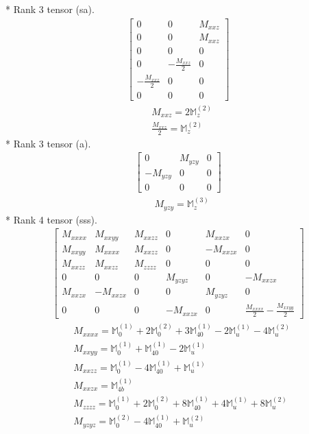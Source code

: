 \documentclass[fleqn,8pt,landscape]{jsarticle}
\begin{document}
* Rank 3 tensor (sa).
\begin{align*}
\begin{bmatrix} 0 & 0 & M_{xxz} \\ 0 & 0 & M_{xxz} \\ 0 & 0 & 0 \\ 0 & - \frac{M_{xxz}}{2} & 0 \\ - \frac{M_{xxz}}{2} & 0 & 0 \\ 0 & 0 & 0 \end{bmatrix}
\end{align*}
\begin{align*}
& M_{xxz} = 2 \mathbb{M}_{z}^{(2)} \\
& \frac{M_{xxz}}{2} = \mathbb{M}_{z}^{(2)}
\end{align*}
* Rank 3 tensor (a).
\begin{align*}
\begin{bmatrix} 0 & M_{yzy} & 0 \\ - M_{yzy} & 0 & 0 \\ 0 & 0 & 0 \end{bmatrix}
\end{align*}
\begin{align*}
& M_{yzy} = \mathbb{M}_{z}^{(3)}
\end{align*}
* Rank 4 tensor (sss).
\begin{align*}
\begin{bmatrix} M_{xxxx} & M_{xxyy} & M_{xxzz} & 0 & M_{xxzx} & 0 \\ M_{xxyy} & M_{xxxx} & M_{xxzz} & 0 & - M_{xxzx} & 0 \\ M_{xxzz} & M_{xxzz} & M_{zzzz} & 0 & 0 & 0 \\ 0 & 0 & 0 & M_{yzyz} & 0 & - M_{xxzx} \\ M_{xxzx} & - M_{xxzx} & 0 & 0 & M_{yzyz} & 0 \\ 0 & 0 & 0 & - M_{xxzx} & 0 & \frac{M_{xxxx}}{2} - \frac{M_{xxyy}}{2} \end{bmatrix}
\end{align*}
\begin{align*}
& M_{xxxx} = \mathbb{M}_{0}^{(1)} + 2 \mathbb{M}_{0}^{(2)} + 3 \mathbb{M}_{40}^{(1)} - 2 \mathbb{M}_{u}^{(1)} - 4 \mathbb{M}_{u}^{(2)} \\
& M_{xxyy} = \mathbb{M}_{0}^{(1)} + \mathbb{M}_{40}^{(1)} - 2 \mathbb{M}_{u}^{(1)} \\
& M_{xxzz} = \mathbb{M}_{0}^{(1)} - 4 \mathbb{M}_{40}^{(1)} + \mathbb{M}_{u}^{(1)} \\
& M_{xxzx} = \mathbb{M}_{4b}^{(1)} \\
& M_{zzzz} = \mathbb{M}_{0}^{(1)} + 2 \mathbb{M}_{0}^{(2)} + 8 \mathbb{M}_{40}^{(1)} + 4 \mathbb{M}_{u}^{(1)} + 8 \mathbb{M}_{u}^{(2)} \\
& M_{yzyz} = \mathbb{M}_{0}^{(2)} - 4 \mathbb{M}_{40}^{(1)} + \mathbb{M}_{u}^{(2)}
\end{align*}
\end{document}
